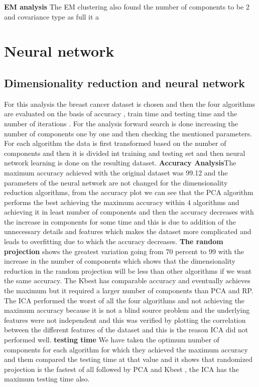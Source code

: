 \documentclass[a4paper,12pt]{article}
\begin{document}
\textbf{EM analysis}  The EM clustering also found the number of components to be 2 and covariance type as full it a 


\section { Neural network }
\subsection{ Dimensionality reduction and neural network }  For this analysis the breast cancer dataset is chosen and then the four algorithms are evaluated on the basis of accuracy , train time and testing time and the number of iterations . For the analysis forward search is done increasing the number of components one by one and then checking the mentioned parameters. For each algorithm the data is first transformed based on the number of components and then it is divided int training and testing set and then neural network learning is done on the resulting dataset. \newline 
\textbf{ Accuracy Analysis}The maximum accuracy achieved with the original dataset was 99.12 and the parameters of the neural network are not changed  for the dimensionality reduction algorithms, from the accuracy plot we can see that the PCA algorithm performs the best achieving the maximum accuracy within 4 algorithms and achieving it in least number of components and then the accuracy decreases with the increase in components for some time and this is due to addition of the unnecessary details and features  which makes the dataset more complicated and leads to overfitting due to which the accuracy decreases. \textbf{The random projection} shows the greatest variation going from 70 percent to 99 with the increase in the number of components which shows that the dimensionality reduction in the random projection will be less than other algorithms if we want the same accuracy. The Kbest has comparable accuracy and eventually achieves the maximum but it required a larger number of components than PCA and RP.  The ICA performed the worst of all the four algorithms and not achieving the maximum accuracy because it is not a blind source problem and the underlying features  were not independent and this was verified by plotting the correlation between the different features of the dataset and this is the reason ICA did not performed well. \newline
\textbf{ testing time} We have taken the optimum number of components for each algorithm for which they achieved the maximum accuracy and them compared the testing time at that value and it shows that randomized projection is the fastest of all followed by PCA and Kbest , the ICA has the maximum testing time also. 
\end{document}
